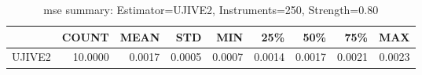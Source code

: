 \begin{table}[ht]
\centering
\caption{mse summary: Estimator=UJIVE2, Instruments=250, Strength=0.80}
\begin{tabular}{lrrrrrrrr}
\toprule
 & COUNT & MEAN & STD & MIN & 25\% & 50\% & 75\% & MAX \\
\midrule
UJIVE2 & 10.0000 & 0.0017 & 0.0005 & 0.0007 & 0.0014 & 0.0017 & 0.0021 & 0.0023 \\
\bottomrule
\end{tabular}
\end{table}
